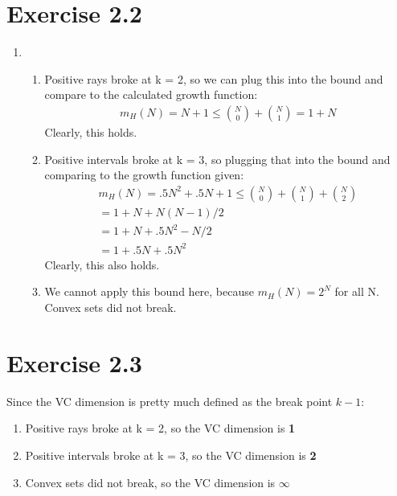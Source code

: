 \documentclass[12pt]{article}
\begin{document}
\section*{Exercise 2.2}
\begin{enumerate}[label=(\alph*)]
	\item 
	\begin{enumerate}
		\item Positive rays broke at k = 2, so we can plug this into the bound and compare to the calculated growth function:
		\begin{gather*}
			m_H(N) = N + 1 \le \binom{N}{0} + \binom{N}{1} = 1 + N
		\end{gather*}
		Clearly, this holds.
		\item Positive intervals broke at k = 3, so plugging that into the bound and comparing to the growth function given:
		\begin{gather*}
			m_H(N) = .5N^2 + .5N + 1 \le \binom{N}{0} + \binom{N}{1} + \binom{N}{2} 
			\\ = 1 + N + N(N-1)/2
			\\ = 1 + N + .5N^2 - N/2
			\\ = 1 + .5N + .5N^2
		\end{gather*}
		Clearly, this also holds.
		\item We cannot apply this bound here, because $m_H(N) = 2^N$ for all N. Convex sets did not break.
	\end{enumerate}
\end{enumerate}
\section*{Exercise 2.3}
Since the VC dimension is pretty much defined as the break point $k-1$:
\begin{enumerate}[label=(\alph*)]
	\item Positive rays broke at k = 2, so the VC dimension is \textbf{1}
	\item Positive intervals broke at k = 3, so the VC dimension is \textbf{2}
	\item Convex sets did not break, so the VC dimension is $\boldsymbol{\infty}$
\end{enumerate}
\end{document}
